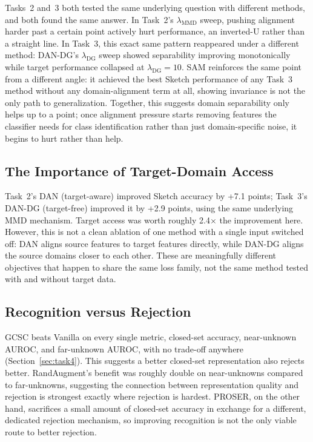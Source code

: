 \documentclass{article}
\begin{document}
Tasks~2 and~3 both tested the same underlying question with different methods, and both found the same answer. In Task~2's $\lambda_\text{MMD}$ sweep, pushing alignment harder past a certain point actively hurt performance, an inverted-U rather than a straight line. In Task~3, this exact same pattern reappeared under a different method: DAN-DG's $\lambda_\text{DG}$ sweep showed separability improving monotonically while target performance collapsed at $\lambda_\text{DG}=10$. SAM reinforces the same point from a different angle: it achieved the best Sketch performance of any Task~3 method without any domain-alignment term at all, showing invariance is not the only path to generalization. Together, this suggests domain separability only helps up to a point; once alignment pressure starts removing features the classifier needs for class identification rather than just domain-specific noise, it begins to hurt rather than help.

\subsection{The Importance of Target-Domain Access}

Task~2's DAN (target-aware) improved Sketch accuracy by +7.1 points; Task~3's DAN-DG (target-free) improved it by +2.9 points, using the same underlying MMD mechanism. Target access was worth roughly 2.4$\times$ the improvement here. However, this is not a clean ablation of one method with a single input switched off: DAN aligns source features to target features directly, while DAN-DG aligns the source domains closer to each other. These are meaningfully different objectives that happen to share the same loss family, not the same method tested with and without target data.

\subsection{Recognition versus Rejection}

GCSC beats Vanilla on every single metric, closed-set accuracy, near-unknown AUROC, and far-unknown AUROC, with no trade-off anywhere (Section~\ref{sec:task4}). This suggests a better closed-set representation also rejects better. RandAugment's benefit was roughly double on near-unknowns compared to far-unknowns, suggesting the connection between representation quality and rejection is strongest exactly where rejection is hardest. PROSER, on the other hand, sacrifices a small amount of closed-set accuracy in exchange for a different, dedicated rejection mechanism, so improving recognition is not the only viable route to better rejection.
\end{document}
